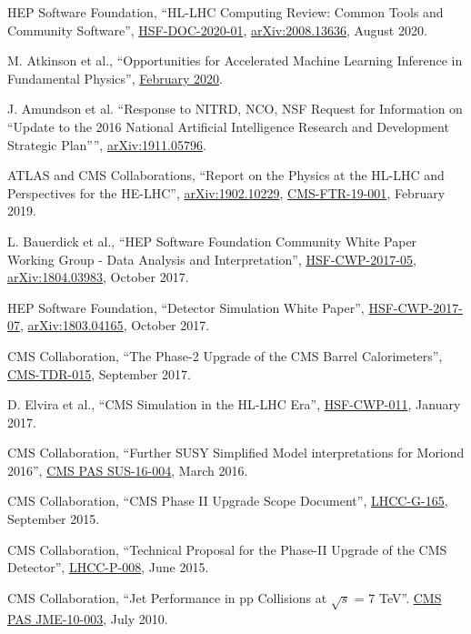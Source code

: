 \begin{description}[leftmargin=12pt,font=\normalfont,labelsep=0em]
\item HEP Software Foundation, ``HL-LHC Computing Review: Common Tools and Community Software'', \href{https://dx.doi.org/10.5281/zenodo.4009114}{HSF-DOC-2020-01}, \href{https://arxiv.org/abs/2008.13636}{arXiv:2008.13636}, August 2020. %
\item M. Atkinson et al., ``Opportunities for Accelerated Machine Learning Inference in Fundamental Physics'', \href{https://fastmachinelearning.org/images/coproc_whitepaper_v0.pdf}{February 2020}.
\item J. Amundson et al. ``Response to NITRD, NCO, NSF Request for Information on ``Update to the 2016 National Artificial Intelligence Research and Development Strategic Plan'''', \href{https://arxiv.org/abs/1911.05796}{arXiv:1911.05796}. %
\item \begin{sloppypar}ATLAS and CMS Collaborations, ``Report on the Physics at the HL-LHC and Perspectives for the HE-LHC'', \href{http://arxiv.org/abs/arXiv:1902.10229}{arXiv:1902.10229}, \href{https://cds.cern.ch/record/2651134}{CMS-FTR-19-001}, February 2019.\end{sloppypar} %
\item L. Bauerdick et al., ``HEP Software Foundation Community White Paper Working Group - Data Analysis and Interpretation'', \href{http://hepsoftwarefoundation.org/activities/cwp.html}{HSF-CWP-2017-05}, \href{https://arxiv.org/abs/1804.03983}{arXiv:1804.03983}, October 2017. %
\item HEP Software Foundation, ``Detector Simulation White Paper'', \href{http://hepsoftwarefoundation.org/activities/cwp.html}{HSF-CWP-2017-07}, \href{https://arxiv.org/abs/1803.04165}{arXiv:1803.04165}, October 2017. %
\item CMS Collaboration, ``The Phase-2 Upgrade of the CMS Barrel Calorimeters'', \href{https://cds.cern.ch/record/2283187}{CMS-TDR-015}, September 2017.
\item D. Elvira et al., ``CMS Simulation in the HL-LHC Era'', \href{http://hepsoftwarefoundation.org/cwp-whitepapers.html}{HSF-CWP-011}, January 2017.
\item CMS Collaboration, ``Further SUSY Simplified Model interpretations for Moriond 2016'', \href{http://cds.cern.ch/record/2140312}{CMS PAS SUS-16-004}, March 2016. %
\item CMS Collaboration, ``CMS Phase II Upgrade Scope Document'', \href{https://cds.cern.ch/record/2055167}{LHCC-G-165}, September 2015.
\item CMS Collaboration, ``Technical Proposal for the Phase-II Upgrade of the CMS Detector'', \href{http://cds.cern.ch/record/2020886}{LHCC-P-008}, June 2015. %
\item CMS Collaboration, ``Jet Performance in pp Collisions at $\sqrt{s}$ = 7 TeV''. \href{http://cds.cern.ch/record/1279362}{CMS PAS JME-10-003}, July 2010. %
\end{description}


